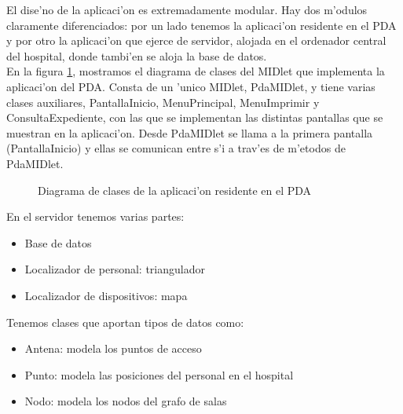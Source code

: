 El dise'no de la aplicaci'on es extremadamente modular. Hay dos m'odulos claramente diferenciados: por un lado tenemos la aplicaci'on residente en el PDA y por otro la aplicaci'on que ejerce de servidor, alojada en el ordenador central del hospital, donde tambi'en se aloja la base de datos.\bigskip \\ En la figura \ref{fig:dclasesPDA}, mostramos el diagrama de clases del MIDlet que implementa la aplicaci'on del PDA. Consta de un 'unico MIDlet, PdaMIDlet, y tiene varias clases auxiliares, PantallaInicio, MenuPrincipal, MenuImprimir y ConsultaExpediente,  con las que se implementan las distintas pantallas que se muestran en la aplicaci'on. Desde PdaMIDlet se llama a la primera pantalla (PantallaInicio) y ellas se comunican entre s'i a trav'es de m'etodos de PdaMIDlet.

\begin{figure}[h!]
	\begin{center}
     	\end{center}
    	\caption{Diagrama de clases de la aplicaci'on residente en el PDA}
	\label{fig:dclasesPDA}
\end{figure}
En el servidor tenemos varias partes:\bigskip\\
\begin{itemize}
	\item Base de datos
	\item Localizador de personal: triangulador
	\item Localizador de dispositivos: mapa
\end{itemize}
Tenemos clases que aportan tipos de datos como: \bigskip\\
\begin{itemize}
	\item Antena: modela los puntos de acceso
	\item Punto: modela las posiciones del personal en el hospital
	\item Nodo: modela los nodos del grafo de salas
\end{itemize}
